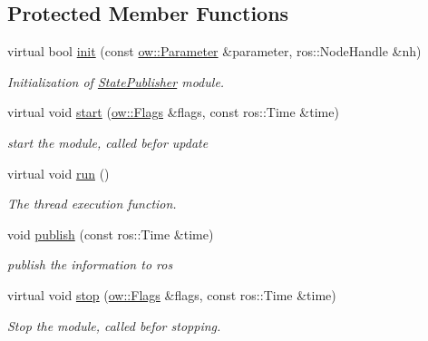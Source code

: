 \subsection*{Protected Member Functions}
\begin{DoxyCompactItemize}
\item 
virtual bool \hyperlink{classow__pub_1_1StatePublisher_a3285df66b266dc6dd9468803f244f745}{init} (const \hyperlink{classow_1_1Parameter}{ow\+::\+Parameter} \&parameter, ros\+::\+Node\+Handle \&nh)\hypertarget{classow__pub_1_1StatePublisher_a3285df66b266dc6dd9468803f244f745}{}\label{classow__pub_1_1StatePublisher_a3285df66b266dc6dd9468803f244f745}

\begin{DoxyCompactList}\small\item\em Initialization of \hyperlink{classow__pub_1_1StatePublisher}{State\+Publisher} module. \end{DoxyCompactList}\item 
virtual void \hyperlink{classow__pub_1_1StatePublisher_a35aa494e2a6e9dec704fa84de731cac7}{start} (\hyperlink{classow__core_1_1Flags}{ow\+::\+Flags} \&flags, const ros\+::\+Time \&time)
\begin{DoxyCompactList}\small\item\em start the module, called befor update \end{DoxyCompactList}\item 
virtual void \hyperlink{classow__pub_1_1StatePublisher_a7c8413da5afc4be130fa95be0e16dbc9}{run} ()\hypertarget{classow__pub_1_1StatePublisher_a7c8413da5afc4be130fa95be0e16dbc9}{}\label{classow__pub_1_1StatePublisher_a7c8413da5afc4be130fa95be0e16dbc9}

\begin{DoxyCompactList}\small\item\em The thread execution function. \end{DoxyCompactList}\item 
void \hyperlink{classow__pub_1_1StatePublisher_aaf2b6be0238f34a9bfb3fd90cc2576cd}{publish} (const ros\+::\+Time \&time)
\begin{DoxyCompactList}\small\item\em publish the information to ros \end{DoxyCompactList}\item 
virtual void \hyperlink{classow__pub_1_1StatePublisher_a48fdc68768ac6d495117676e9f06e721}{stop} (\hyperlink{classow__core_1_1Flags}{ow\+::\+Flags} \&flags, const ros\+::\+Time \&time)
\begin{DoxyCompactList}\small\item\em Stop the module, called befor stopping. \end{DoxyCompactList}\end{DoxyCompactItemize}
